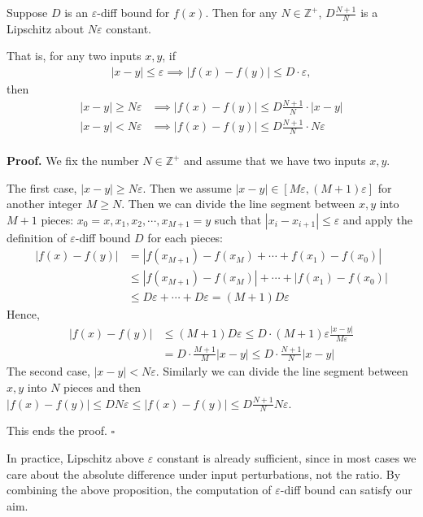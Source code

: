 	
	\begin{proposition}
		
		Suppose $D$ is an $\varepsilon$-diff bound for $f(x)$. Then for any $N\in\mathbb{Z}^+$, $D\frac{N+1}{N}$ is a Lipschitz about $N\varepsilon$ constant.
		
		That is, for any two inputs $x,y$, if \begin{align*}
			|x-y|\leq \varepsilon \implies |f(x)-f(y)| \leq D \cdot \varepsilon,
		\end{align*} then 	 \begin{align*}
			|x-y|\geq N\varepsilon &\implies |f(x)-f(y)| \leq D\frac{N+1}{N} \cdot |x-y|\\
			|x-y|<N\varepsilon &\implies |f(x)-f(y)| \leq D\frac{N+1}{N} \cdot N\varepsilon\\
		\end{align*}
	\end{proposition}
	
	\textbf{Proof.} We fix the number $N\in\mathbb{Z}^+$ and assume that we have two inputs $x, y$.
	
	The first case, $|x-y|\geq N\varepsilon$. Then we assume $|x-y| \in [M\varepsilon ,  (M+1)\varepsilon]$ for another integer $M\geq N$. Then we can divide the line segment between $x, y$ into $M+1$ pieces: $x_0 = x, x_1, x_2, \cdots, x_{M+1} = y$ such that $|x_i-x_{i+1}| \leq \varepsilon$ and apply the definition of $\varepsilon$-diff bound $D$ for each pieces:\begin{align*}
		|f(x)-f(y)| &= |f(x_{M+1})-f(x_M)+\cdots+f(x_1)-f(x_0)|\\
		&\leq |f(x_{M+1})-f(x_M)|+\cdots+|f(x_1)-f(x_0)|\\
		&\leq D\varepsilon + \cdots +D\varepsilon = (M+1)D\varepsilon
	\end{align*}
	Hence,\begin{align*}
		|f(x)-f(y)| &\leq (M+1)D\varepsilon \leq D\cdot (M+1)\varepsilon \frac{|x-y|}{M\varepsilon}\\
		&= D\cdot\frac{M+1}{M} |x-y|	\leq   D\cdot\frac{N+1}{N} |x-y|		
	\end{align*}
	The second case, $|x-y|< N\varepsilon$. Similarly we can divide the line segment between $x, y$ into $N$ pieces and then $|f(x)-f(y)|\leq D N\varepsilon\leq |f(x)-f(y)|\leq D \frac{N+1}{N} N\varepsilon$.
	
	This ends the proof.
	\hfill $\square$
	
	In practice, Lipschitz above $\varepsilon$ constant is already sufficient, since in most cases we care about the absolute difference under input perturbations, not the ratio. By combining the above proposition, the computation of $\varepsilon$-diff bound can satisfy our aim.
	
